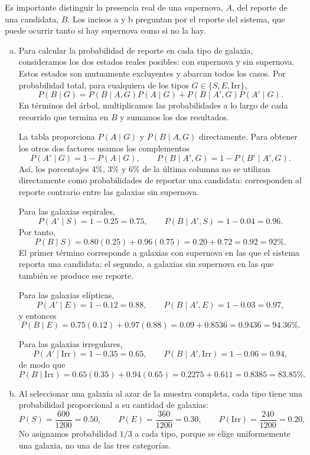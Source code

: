 \documentclass[a4paper]{article}
\begin{document}
Es importante distinguir la presencia real de una supernova, $A$, del reporte de una candidata, $B$. Los incisos a y b preguntan por el reporte del sistema, que puede ocurrir tanto si hay supernova como si no la hay.

\begin{enumerate}[a)]
\item Para calcular la probabilidad de reporte en cada tipo de galaxia, consideramos los dos estados reales posibles: con supernova y sin supernova. Estos estados son mutuamente excluyentes y abarcan todos los casos. Por probabilidad total, para cualquiera de los tipos $G\in\{S,E,\mathrm{Irr}\}$,
$$
P(B\mid G)
=P(B\mid A,G)P(A\mid G)
 +P(B\mid A',G)P(A'\mid G).
$$
En términos del árbol, multiplicamos las probabilidades a lo largo de cada recorrido que termina en $B$ y sumamos los dos resultados.

La tabla proporciona $P(A\mid G)$ y $P(B\mid A,G)$ directamente. Para obtener los otros dos factores usamos los complementos
$$
P(A'\mid G)=1-P(A\mid G),
\qquad
P(B\mid A',G)=1-P(B'\mid A',G).
$$
Así, los porcentajes $4\%$, $3\%$ y $6\%$ de la última columna no se utilizan directamente como probabilidades de reportar una candidata: corresponden al reporte contrario entre las galaxias sin supernova.

Para las galaxias espirales,
$$
P(A'\mid S)=1-0.25=0.75,
\qquad
P(B\mid A',S)=1-0.04=0.96.
$$
Por tanto,
$$
P(B\mid S)=0.80(0.25)+0.96(0.75)=0.20+0.72
=\boxed{0.92=92\%}.
$$
El primer término corresponde a galaxias con supernova en las que el sistema reporta una candidata; el segundo, a galaxias sin supernova en las que también se produce ese reporte.

Para las galaxias elípticas,
$$
P(A'\mid E)=1-0.12=0.88,
\qquad
P(B\mid A',E)=1-0.03=0.97,
$$
y entonces
$$
P(B\mid E)=0.75(0.12)+0.97(0.88)=0.09+0.8536
=\boxed{0.9436=94.36\%}.
$$

Para las galaxias irregulares,
$$
P(A'\mid\mathrm{Irr})=1-0.35=0.65,
\qquad
P(B\mid A',\mathrm{Irr})=1-0.06=0.94,
$$
de modo que
$$
P(B\mid\mathrm{Irr})=0.65(0.35)+0.94(0.65)=0.2275+0.611
=\boxed{0.8385=83.85\%}.
$$

\item Al seleccionar una galaxia al azar de la muestra completa, cada tipo tiene una probabilidad proporcional a su cantidad de galaxias:
$$
P(S)=\frac{600}{1200}=0.50,
\qquad
P(E)=\frac{360}{1200}=0.30,
\qquad
P(\mathrm{Irr})=\frac{240}{1200}=0.20.
$$
No asignamos probabilidad $1/3$ a cada tipo, porque se elige uniformemente una galaxia, no una de las tres categorías.


\end{enumerate}
\end{document}
